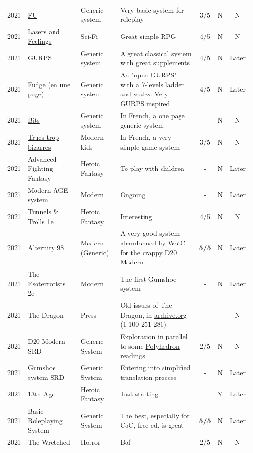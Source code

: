 \documentclass[a4paper, 11pt, twoside]{article}
\begin{document}
\begin{longtable}{cp{2cm}p{1.5cm}p{7cm}ccc}
2021 & \href{https://www.drivethrurpg.com/product/89534/FU-The-Freeform-Universal-RPG-Classic-rules}{FU} & Generic system & Very basic system for roleplay & 3/5 & N & N\\
2021 & \href{http://www.onesevendesign.com/laserfeelings/}{Lasers and Feelings} & Sci-Fi & Great simple RPG & 4/5 & N & N\\
2021 & GURPS & Generic system & A great classical system with great supplements & 4/5 & N & Later\\
2021 & \href{https://github.com/orey/jdr/blob/master/Fudge-fr/FudgeEnUnePage-ORey03.pdf}{Fudge} (en une page) & Generic system & An "open GURPS" with a 7-levels ladder and scales. Very GURPS inspired & 4/5 & N & Later\\
2021 & \href{http://komajdr.free.fr/fichiers/BiTs.rar}{Bits } & Generic system & In French, a one page generic system & - & N & N\\
2021 & \href{http://storygame.free.fr/}{Trucs trop bizarres} & Modern kids & In French, a very simple game system & 3/5 & N & N\\
2021 & Advanced Fighting Fantasy & Heroic Fantasy & To play with children & - & N & Later\\
2021 & Modern AGE system & Modern & Ongoing & - & N & Later\\
2021 & Tunnels \& Trolls 1e & Heroic Fantasy & Interesting & 4/5 & N & N\\
2021 & Alternity 98 & Modern (Generic) & A very good system abandonned by WotC for the crappy D20 Modern & \textbf{5/5} & N & Later\\
2021 & The Esoterrorists 2e & Modern & The first Gumshoe system & - & N & Later\\
2021 & The Dragon & Press & Old issues of The Dragon, in \href{https://archive.org/details/DragonMagazine045\_201903}{archive.org} (1-100 251-280) & - & - & N\\
2021 & D20 Modern SRD & Generic System & Exploration in parallel to some \href{https://archive.org/details/Polyhedron105}{Polyhedron} readings & 2/5 & N & N\\
2021 & Gumshoe system SRD & Generic System & Entering into simplified translation process & - & N & Later\\
2021 & 13th Age & Heroic Fantasy & Just starting & - & Y & Later\\
2021 & Basic Roleplaying System & Generic System & The best, especially for CoC, free ed. is great & \textbf{5/5} & N & Later\\
2021 & The Wretched & Horror & Bof & 2/5 & N & N\\

\end{longtable}
\end{document}
